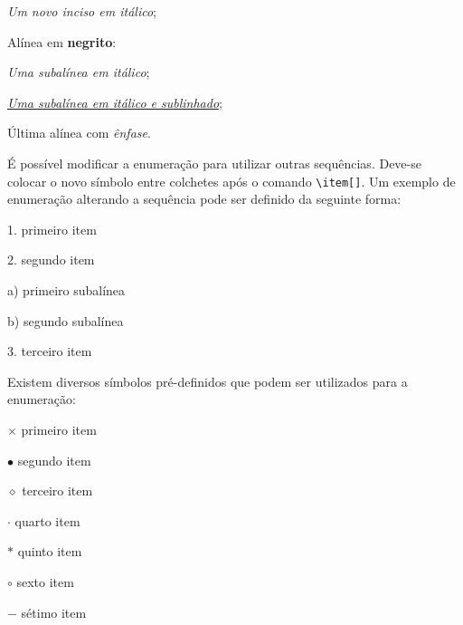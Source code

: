 \begin{alineas}
  \begin{incisos}
    \item \textit{Um novo inciso em itálico};
  \end{incisos}
  
  \item Alínea em \textbf{negrito}:
  
  \begin{subalineas}
    \item \textit{Uma subalínea em itálico};
    \item \underline{\textit{Uma subalínea em itálico e sublinhado}}; 
  \end{subalineas}
  
  \item Última alínea com \emph{ênfase}.
  
\end{alineas}

É possível modificar a enumeração para utilizar outras sequências. Deve-se colocar o novo símbolo entre colchetes após o comando \verb=\item[]=. Um exemplo de enumeração alterando a sequência pode ser definido da seguinte forma:

\begin{alineas}
	\item[1.] primeiro item
	\item[2.] segundo item
	\begin{alineas}
		\item[a)] primeiro subalínea 
		\item[b)] segundo subalínea
	\end{alineas}
	\item[3.] terceiro item
\end{alineas}

Existem diversos símbolos pré-definidos que podem ser utilizados para a enumeração:

\begin{alineas}
	\item[$\times$] primeiro item
	\item[$\bullet$] segundo item
	\item[$\diamond$] terceiro item
	\item[$\cdot$] quarto item
	\item[$\ast$] quinto item
	\item[$\circ$] sexto item
	\item[$-$] sétimo item
\end{alineas}

